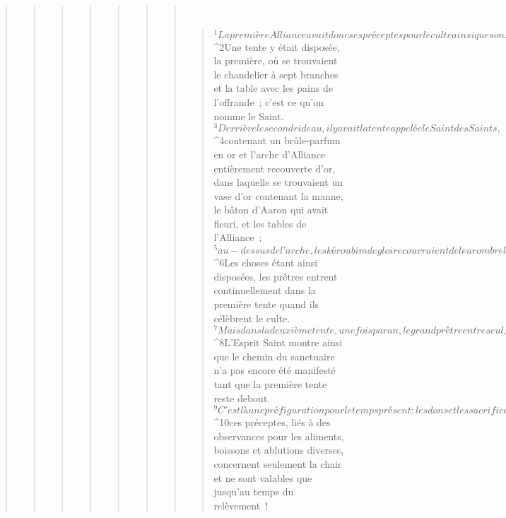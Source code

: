 \begin{verse}
\begin{verse}
\begin{verse}
\begin{verse}
\begin{verse}
\begin{verse}
\begin{verse}
         
      \bchapter{}
      \begin{verse}
${}^{1}La première Alliance avait donc ses préceptes pour le culte ainsi que son Lieu saint dans ce monde. 
${}^{2}Une tente y était disposée, la première, où se trouvaient le chandelier à sept branches et la table avec les pains de l’offrande ; c’est ce qu’on nomme le Saint. 
${}^{3}Derrière le second rideau, il y avait la tente appelée le Saint des Saints, 
${}^{4}contenant un brûle-parfum en or et l’arche d’Alliance entièrement recouverte d’or, dans laquelle se trouvaient un vase d’or contenant la manne, le bâton d’Aaron qui avait fleuri, et les tables de l’Alliance ; 
${}^{5}au-dessus de l’arche, les kéroubim de gloire couvraient de leur ombre la plaque d’or appelée propitiatoire. Mais il n’y a pas lieu maintenant d’entrer dans les détails. 
${}^{6}Les choses étant ainsi disposées, les prêtres entrent continuellement dans la première tente quand ils célèbrent le culte. 
${}^{7}Mais dans la deuxième tente, une fois par an, le grand prêtre entre seul, et il ne le fait pas sans offrir du sang pour lui-même et pour les fautes que le peuple a commises par ignorance. 
${}^{8}L’Esprit Saint montre ainsi que le chemin du sanctuaire n’a pas encore été manifesté tant que la première tente reste debout. 
${}^{9}C’est là une préfiguration pour le temps présent : les dons et les sacrifices qui sont offerts ne sont pas capables de mener à la perfection dans sa conscience celui qui célèbre le culte ; 
${}^{10}ces préceptes, liés à des observances pour les aliments, boissons et ablutions diverses, concernent seulement la chair et ne sont valables que jusqu’au temps du relèvement !
      

\end{verse}
\end{verse}
\end{verse}
\end{verse}
\end{verse}
\end{verse}
\end{verse}
\end{verse}
